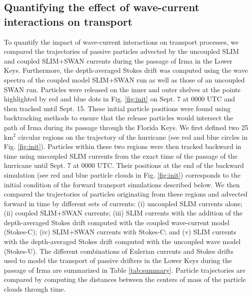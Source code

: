 \documentclass[preprint,12pt,authoryear]{elsarticle}
\begin{document}
\subsection{Quantifying the effect of wave-current interactions on transport}\label{sec:traj}

To quantify the impact of wave-current interactions on transport processes, we compared the trajectories of passive particles advected by the uncoupled SLIM and coupled SLIM+SWAN currents during the passage of Irma in the Lower Keys. Furthermore, the depth-averaged Stokes drift was computed using the wave spectra of the coupled model SLIM+SWAN run as well as those of an uncoupled SWAN run. Particles were released on the inner and outer shelves at the points highlighted by red and blue dots in Fig. \ref{fig:init} on Sept. 7 at 0000 UTC and then tracked until Sept. 15. These initial particle positions were found using backtracking methods \citep{spivakovskaya2005simulation} to ensure that the release particles would intersect the path of Irma during its passage through the Florida Keys. We first defined two 25 km$^\text{2}$ circular regions on the trajectory of the hurricane (see red and blue circles in Fig. \ref{fig:init}). Particles within these two regions were then tracked backward in time using uncoupled SLIM currents from the exact time of the passage of the hurricane until Sept. 7 at 0000 UTC. Their positions at the end of the backward simulation (see red and blue particle clouds in Fig. \ref{fig:init}) corresponds to the initial condition of the forward transport simulations described below. We then compared the trajectories of particles originating from these regions and advected forward in time by different sets of currents: (i) uncoupled SLIM currents alone; (ii) coupled SLIM+SWAN currents; (iii) SLIM currents with the addition of the depth-averaged Stokes drift computed with the coupled wave-current model (Stokes-C); (iv) SLIM+SWAN currents with Stokes-C; and (v) SLIM currents with the depth-averaged Stokes drift computed with the uncoupled wave model (Stokes-U). The different combinations of Eulerian currents and Stokes drifts used to model the transport of passive drifters in the Lower Keys during the passage of Irma are summarized in Table \ref{tab:summary}. Particle trajectories are compared by computing the distances between the centers of mass of the particle clouds through time.
\end{document}
